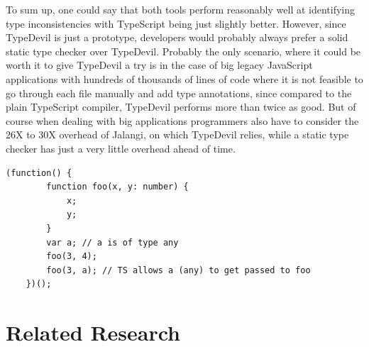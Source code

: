 \documentclass[runningheads,a4paper]{llncs}
\begin{document}
To sum up, one could say that both tools perform reasonably well at identifying type inconsistencies with TypeScript being just slightly better.
However, since TypeDevil is just a prototype, developers would probably always prefer a solid static type checker over TypeDevil.
Probably the only scenario, where it could be worth it to give TypeDevil a try is in the case of big legacy JavaScript applications with hundreds of thousands of lines of code where it is not feasible to go through each file manually and add type annotations, since compared to the plain TypeScript compiler, TypeDevil performs more than twice as good.
But of course when dealing with big applications programmers also have to consider the 26X to 30X overhead of Jalangi, on which TypeDevil relies, while a static type checker has just a very little overhead ahead of time.

\medskip\medskip
\lstset{language=javascript}
\begin{minipage}{\linewidth}
\begin{lstlisting}[frame=single, caption=Inconsistent Function Args , label={lst:InconsistentFunctionArgs}]
    (function() {
        function foo(x, y: number) {
            x;
            y;
        } 
        var a; // a is of type any
        foo(3, 4);
        foo(3, a); // TS allows a (any) to get passed to foo
    })();
\end{lstlisting}
\end{minipage}

\newpage

\section{Related Research}
\end{document}
